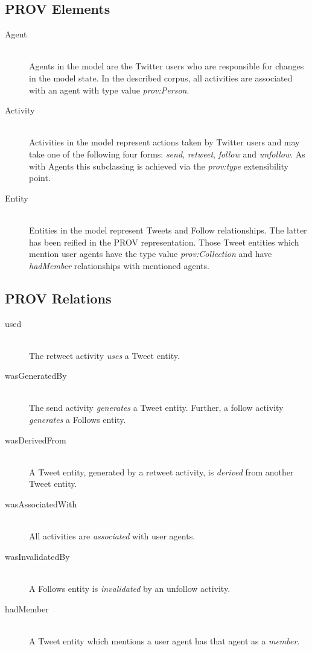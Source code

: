 \documentclass{llncs2e/llncs}
\begin{document}
\subsection{PROV Elements}
%
\begin{description}
  \item[Agent] \hfill \\
  Agents in the model are the Twitter users who are responsible for changes in the model state. In the described corpus, all activities are associated with an agent with type value \textit{prov:Person}.
  \item[Activity] \hfill \\
  Activities in the model represent actions taken by Twitter users and may take one of the following four forms: \textit{send}, \textit{retweet}, \textit{follow} and \textit{unfollow}. As with Agents this subclassing is achieved via the \textit{prov:type} extensibility point.
  \item[Entity] \hfill \\
  Entities in the model represent Tweets and Follow relationships. The latter has been reified in the PROV representation. Those Tweet entities which mention user agents have the type value \textit{prov:Collection} and have \textit{hadMember} relationships with mentioned agents.
\end{description}
%
\subsection{PROV Relations}
%
\begin{description}
  \item[used] \hfill \\
  The retweet activity \textit{uses} a Tweet entity.
  \item[wasGeneratedBy] \hfill \\
  The send activity \textit{generates} a Tweet entity. Further, a follow activity \textit{generates} a Follows entity.
  \item[wasDerivedFrom] \hfill \\
  A Tweet entity, generated by a retweet activity, is \textit{derived} from another Tweet entity.
  \item[wasAssociatedWith] \hfill \\
  All activities are \textit{associated} with user agents.
  \item[wasInvalidatedBy] \hfill \\
  A Follows entity is \textit{invalidated} by an unfollow activity. 
  \item[hadMember] \hfill \\
  A Tweet entity which mentions a user agent has that agent as a \textit{member}.
\end{description}
%
\end{document}
